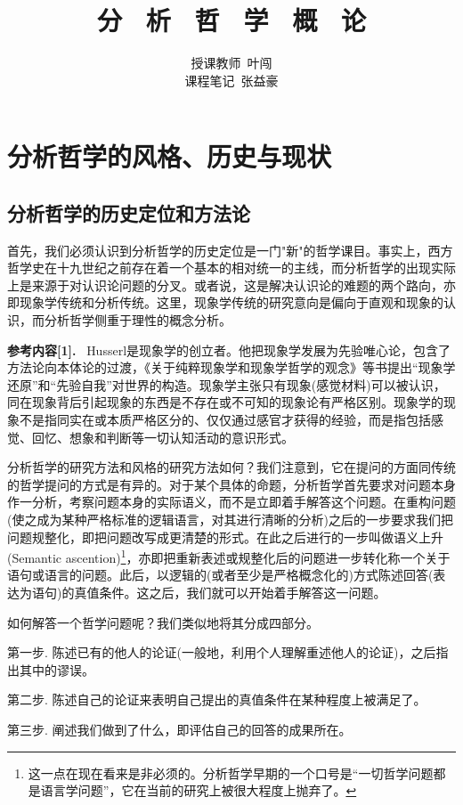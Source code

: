 \documentclass{article}
\title{\heiti 分 \ 析 \ 哲 \ 学 \ 概 \ 论 }
\author{\kaishu 授课教师\ 叶闯 \\\kaishu 课程笔记\ 张益豪}
\begin{document}
\maketitle
\tableofcontents
\newpage
\renewcommand{\baselinestretch}{1.5}
\section{分析哲学的风格、历史与现状}
\subsection{分析哲学的历史定位和方法论}
首先，我们必须认识到分析哲学的历史定位是一门"新"的哲学课目。事实上，西方哲学史在十九世纪之前存在着一个基本的相对统一的主线，而分析哲学的出现实际上是来源于对认识论问题的分叉。或者说，这是解决认识论的难题的两个路向，亦即现象学传统和分析传统。这里，现象学传统的研究意向是偏向于直观和现象的认识，而分析哲学侧重于理性的概念分析。

\textbf{\kaishu 参考内容[1].} \ {\kaishu Husserl是现象学的创立者。他把现象学发展为先验唯心论，包含了方法论向本体论的过渡，《关于纯粹现象学和现象学哲学的观念》等书提出“现象学还原”和“先验自我”对世界的构造。现象学主张只有现象(感觉材料)可以被认识，同在现象背后引起现象的东西是不存在或不可知的现象论有严格区别。现象学的现象不是指同实在或本质严格区分的、仅仅通过感官才获得的经验，而是指包括感觉、回忆、想象和判断等一切认知活动的意识形式。}

分析哲学的研究方法和风格的研究方法如何？我们注意到，它在提问的方面同传统的哲学提问的方式是有异的。对于某个具体的命题，分析哲学首先要求对问题本身作一分析，考察问题本身的实际语义，而不是立即着手解答这个问题。在重构问题(使之成为某种严格标准的逻辑语言，对其进行清晰的分析)之后的一步要求我们把问题{\heiti 规整化}，即把问题改写成更清楚的形式。在此之后进行的一步叫做语义上升(Semantic ascention)\footnote{这一点在现在看来是非必须的。分析哲学早期的一个口号是“一切哲学问题都是语言学问题”，它在当前的研究上被很大程度上抛弃了。}，亦即把重新表述或规整化后的问题进一步转化称一个关于语句或语言的问题。此后，以逻辑的(或者至少是严格概念化的)方式陈述回答(表达为语句)的真值条件。这之后，我们就可以开始着手解答这一问题。

如何解答一个哲学问题呢？我们类似地将其分成四部分。

{\kaishu 第一步.} 陈述已有的他人的论证(一般地，利用个人理解重述他人的论证)，之后指出其中的谬误。

{\kaishu 第二步.} 陈述自己的论证来表明自己提出的真值条件在某种程度上被满足了。

{\kaishu 第三步.} 阐述我们做到了什么，即评估自己的回答的成果所在。
\end{document}
